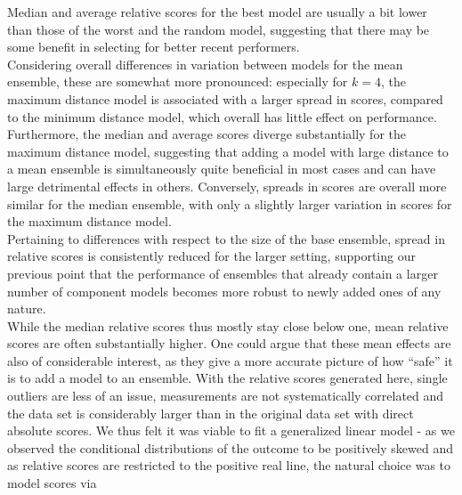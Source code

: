 Median and average relative scores for the best model are usually a bit lower than those of the worst and the random model, suggesting that there may be some benefit in selecting for better recent performers.\\
Considering overall differences in variation between models for the mean ensemble, these are somewhat more pronounced: especially for $k = 4$, the maximum distance model is associated with a larger spread in scores, compared to the minimum distance model, which overall has little effect on performance. Furthermore, the median and average scores diverge substantially for the maximum distance model, suggesting that adding a model with large distance to a mean ensemble is simultaneously quite beneficial in most cases and can have large detrimental effects in others. Conversely, spreads in scores are overall more similar for the median ensemble, with only a slightly larger variation in scores for the maximum distance model.\\
Pertaining to differences with respect to the size of the base ensemble, spread in relative scores is consistently reduced for the larger setting, supporting our previous point that the performance of ensembles that already contain a larger number of component models becomes more robust to newly added ones of any nature. \medskip\\
While the median relative scores thus mostly stay close below one, mean relative scores are often substantially higher. One could argue that these mean effects are also of considerable interest, as they give a more accurate picture of how ``safe'' it is to add a model to an ensemble. With the relative scores generated here, single outliers are less of an issue, measurements are not systematically correlated and the data set is considerably larger than in the original data set with direct absolute scores. We thus felt it was viable to fit a generalized linear model - as we observed the conditional distributions of the outcome to be positively skewed and as relative scores are restricted to the positive real line, the natural choice was to model scores via 
